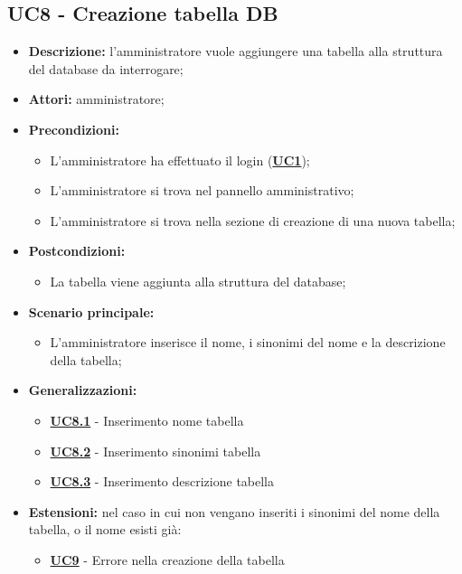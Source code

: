 \documentclass[5pt]{article}
\begin{document}
\subsection{UC8 - Creazione tabella DB}
\label{sec:UC8}
\begin{itemize}
	\item \textbf{Descrizione:} l’amministratore vuole aggiungere una tabella alla struttura del database da interrogare;
	\item \textbf{Attori:} amministratore;
	\item \textbf{Precondizioni:} 
	\begin{itemize}
		\item L’amministratore ha effettuato il login (\hyperref[sec:UC1]{\textbf{UC1}});
		\item L’amministratore si trova nel pannello amministrativo;
		\item L’amministratore si trova nella sezione di creazione di una nuova tabella;
	\end{itemize}
	\item \textbf{Postcondizioni:} 
	\begin{itemize}
		\item La tabella viene aggiunta alla struttura del database;
	\end{itemize}
	\item \textbf{Scenario principale:} 
	\begin{itemize}
		\item L’amministratore inserisce il nome, i sinonimi del nome e la descrizione della tabella;
	\end{itemize}
	\item \textbf{Generalizzazioni:} 
	\begin{itemize}
		\item \hyperref[sec:UC8.1]{\textbf{UC8.1}} - Inserimento nome tabella
		\item \hyperref[sec:UC8.2]{\textbf{UC8.2}} - Inserimento sinonimi tabella
		\item \hyperref[sec:UC8.3]{\textbf{UC8.3}} - Inserimento descrizione tabella
	\end{itemize}
	\item \textbf{Estensioni:} nel caso in cui non vengano inseriti i sinonimi del nome della tabella, o il nome esisti già:
	\begin{itemize}
		\item \hyperref[sec:UC9]{\textbf{UC9}} - Errore nella creazione della tabella
	\end{itemize}
\end{itemize}
\end{document}
